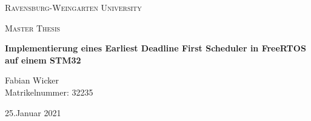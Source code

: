 \documentclass[../EDF Master Thesis.tex]{subfiles}
\begin{document}
    \centering
    {\scshape\LARGE Ravensburg-Weingarten University\par}
    \vspace{1.5cm}
    \begin{figure}[hb]
        \centering
        \rwulogo[width=0.4\columnwidth]
    \end{figure}
    \vspace{5cm}
    {\scshape\Large Master Thesis\par}
    \vspace{0.25cm}
    {\huge\bfseries Implementierung eines Earliest Deadline First Scheduler in FreeRTOS auf einem STM32\par}
    \vspace{4cm}
    {\Large Fabian Wicker \\
    Matrikelnummer: 32235\par}
    \vfill
    {\large 25.Januar 2021\par}
\end{document}
